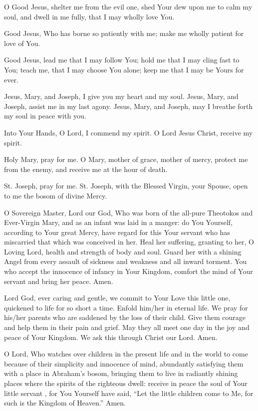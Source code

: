 O Good Jesus, shelter me from the evil one, shed Your dew upon me to calm my soul, and dwell in me fully, that I may wholly love You.

Good Jesus, Who has borne so patiently with me;
make me wholly patient for love of You.

Good Jesus, lead me that I may follow You; hold me that I may cling fast to You;
teach me, that I may choose You alone; keep me that I may be Yours for ever.

Jesus, Mary, and Joseph, I give you my heart and my soul.
Jesus, Mary, and Joseph, assist me in my last agony.
Jesus, Mary, and Joseph, may I breathe forth my soul in peace with you.

Into Your Hands, O Lord, I commend my spirit.
O Lord Jesus Christ, receive my spirit.

Holy Mary, pray for me.
O Mary, mother of grace, mother of mercy, protect me from the enemy, and receive me at the hour of death.

St. Joseph, pray for me.
St. Joseph, with the Blessed Virgin, your Spouse, open to me the bosom of divine Mercy.

O Sovereign Master, Lord our God, Who was born of the all-pure Theotokos and Ever-Virgin Mary, and as an infant was laid in a manger:
do You Yourself, according to Your great Mercy, have regard for this Your servant \insertname who has miscarried that which was conceived in her.
Heal her suffering, granting to her, O Loving Lord, health and strength of body and soul.
Guard her with a shining Angel from every assault of sickness and weakness and all inward torment.
You who accept the innocence of infancy in Your Kingdom, comfort the mind of Your servant and bring her peace.
Amen.

Lord God, ever caring and gentle, we commit to Your Love this little one, quickened to life for so short a time.
Enfold him/her in eternal life.
We pray for his/her parents who are saddened by the loss of their child.
Give them courage and help them in their pain and grief.
May they all meet one day in the joy and peace of Your Kingdom.
We ask this through Christ our Lord.
Amen.

O Lord, Who watches over children in the present life and in the world to come because of their simplicity and innocence of mind, abundantly satisfying them with a place in Abraham's bosom, bringing them to live in radiantly shining places where the spirits of the righteous dwell:
receive in peace the soul of Your little servant \insertname, for You Yourself have said, ``Let the little children come to Me, for such is the Kingdom of Heaven.''
Amen.